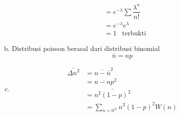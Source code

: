 \begin{enumerate}
\begin{enumerate}[(a)]
\begin{equation*}
\begin{split}
                &=e^{-\lambda} \sum \dfrac{\lambda^n}{n!}\\
                &=e^{-\lambda}e^{\lambda}\\
                &=1\;\;\;\text{terbukti}
            \end{split}
        \end{equation*}
        \item Distribusi poisson berasal dari distribusi binomial
        \begin{equation*}
            \bar{n}=np
        \end{equation*}
        \item 
        \begin{equation*}
            \begin{split}
                \bar{\Delta n^2}&=\bar{n-\bar{n}}^2\\
                &=\bar{n-np}^2\\
                &=\bar{n^2(1-p)^2}\\
                &=\sum_{n=0^N} n^2(1-p)^2W(n)
            \end{split}
        \end{equation*}
    \end{enumerate}
\end{enumerate}